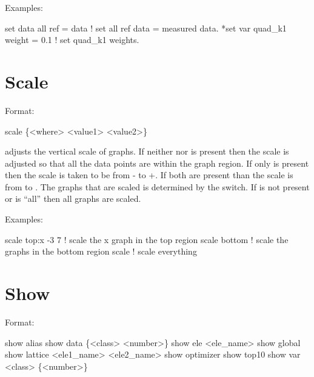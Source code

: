 Examples:
\begin{example}
  set data all ref = data       ! set all ref data = measured data.
  *set var quad_k1 weight = 0.1 ! set quad_k1 weights. 
\end{example}

\section{Scale}
\label{s:scale}

Format:
\begin{example}
  scale \{<where> <value1> <value2>\}
\end{example}

\vskip 0.2in  adjusts the vertical scale of graphs. If
neither  nor  is present then the scale is
adjusted so that all the data points are within the graph region.  If
only  is present then the scale is taken to be from
- to +. If both are present than the scale
is from  to .  The graphs that are scaled
is determined by the  switch. If  is not
present  or  is ``all'' then all graphs are scaled. 

Examples:
\begin{example}
  scale top:x -3  7  ! scale the x graph in the top region
  scale bottom       ! scale the graphs in the bottom region
  scale              ! scale everything
\end{example}


\section{Show}
\label{s:show}

Format:
\begin{example}
  show alias                     
  show data \{<class> <number>\} 
  show ele <ele_name>
  show global
  show lattice <ele1_name> <ele2_name>
  show optimizer
  show top10
  show var <class> \{<number>\}
\end{example}

